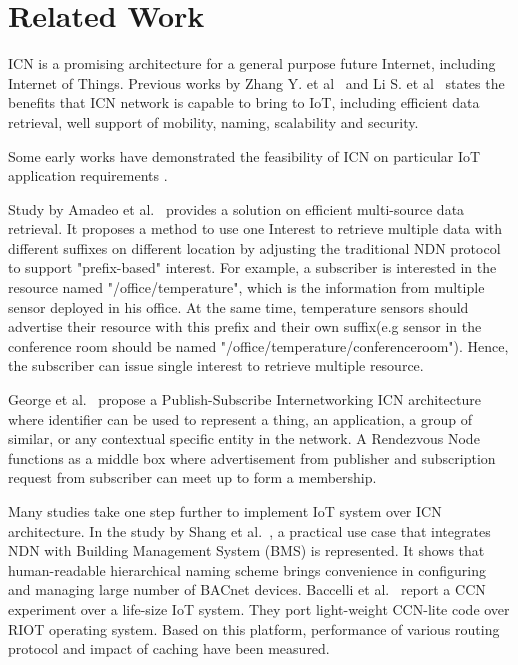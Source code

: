 \section{Related Work}
\label{sec:related}
ICN is a promising architecture for a general purpose future Internet, including Internet of Things. Previous works by Zhang Y. et al~\cite{zhang2013icn} and Li S. et al~\cite{li2014comparative} states the benefits that ICN network is capable to bring to IoT, including efficient data retrieval, well support of mobility, naming, scalability and security.


Some early works have demonstrated the feasibility of ICN on particular IoT application requirements .  


Study by Amadeo et al.~\cite{amadeo2014multi} provides a solution on efficient multi-source data retrieval. It proposes a method to use one Interest to retrieve multiple data with different suffixes on different location by adjusting the traditional NDN protocol to support "prefix-based" interest. For example, a subscriber is interested in the resource named "/office/temperature", which is the information from multiple sensor deployed in his office. At the same time, temperature sensors should advertise their resource with this prefix and their own suffix(e.g sensor in the conference room should be named "/office/temperature/conferenceroom"). Hence, the subscriber can issue single interest to retrieve multiple resource.


George et al.~\cite{polyzos2015building} propose a Publish-Subscribe Internetworking ICN architecture
where identifier can be used to represent a thing, an application, a group of similar, or any contextual specific entity in the network. A Rendezvous Node functions as a middle box where advertisement from publisher and subscription request from subscriber can meet up to form a membership. 


Many studies take one step further to implement IoT system over ICN architecture. In the study by Shang et al.~\cite{shang2014securing}, a practical use case that integrates NDN with Building Management System (BMS) is represented. It shows that human-readable hierarchical naming scheme brings convenience in configuring and managing large number of BACnet devices. Baccelli et al.~\cite{baccelli2014information} report a CCN experiment over a life-size IoT system. They port light-weight CCN-lite code over RIOT operating system. Based on this platform, performance of various routing protocol and impact of caching have been measured.  

